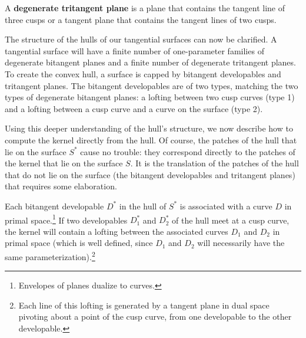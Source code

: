 \documentclass[12pt]{article}
\begin{document}

\begin{defn2}
A {\bf degenerate tritangent plane} is 
a plane that contains the tangent line of three cusps or
a tangent plane that contains the tangent lines of two cusps.
\end{defn2}

The structure of the hulls of our tangential surfaces can now be clarified.
A tangential surface will have a finite number of one-parameter families of degenerate bitangent planes
and a finite number of degenerate tritangent planes.
To create the convex hull, a surface is capped by bitangent developables and tritangent planes.
The bitangent developables
are of two types, matching the two types of degenerate bitangent planes: 
a lofting between two cusp curves (type 1) and
a lofting between a cusp curve and a curve on the surface (type 2).

Using this deeper understanding of the hull's structure,
we now describe how to compute the kernel directly from the hull.
Of course, the patches of the hull that lie on the surface $S^*$
cause no trouble: they correspond directly
to the patches of the kernel that lie on the surface $S$.
It is the translation of the patches of the hull that do not lie on the surface 
(the bitangent developables and tritangent planes)
that requires some elaboration.

Each bitangent developable $D^*$ in the hull of $S^*$ 
is associated with a curve $D$ in primal space.\footnote{Envelopes
	of planes dualize to curves.}
If two developables $D_1^*$ and $D_2^*$ of the hull meet at a cusp curve, 
the kernel will contain a lofting between the associated curves 
$D_1$ and $D_2$ in primal space 
(which is well defined, since $D_1$ and $D_2$ 
will necessarily have the same parameterization).\footnote{Each line 
	of this lofting is generated by a tangent plane in dual space pivoting 
	about a point of the cusp curve,
	from one developable to the other developable.}
\end{document}
